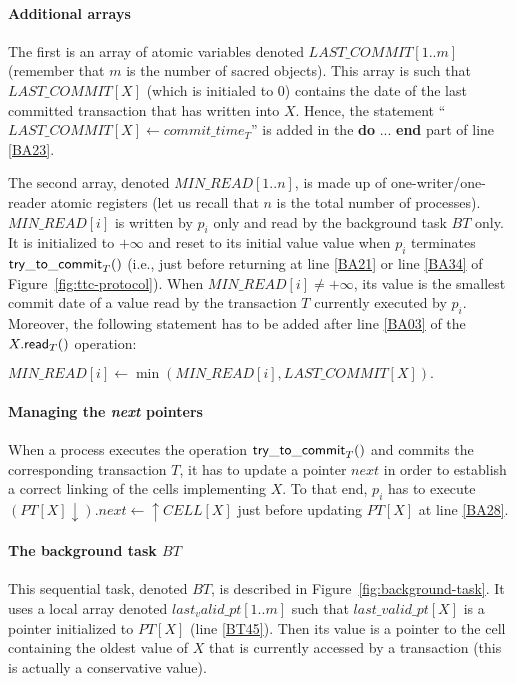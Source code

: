 \paragraph{Additional arrays}
The first is an array of atomic 
variables denoted $\mathit{LAST\_COMMIT}[1..m]$ 
(remember that $m$ is the number of sacred objects).  This array 
is such that  $\mathit{LAST\_COMMIT}[X]$ (which is initialed to $0$) 
contains the date of the last  committed transaction that has written into $X$.
Hence, the  statement ``$\mathit{LAST\_COMMIT}[X] \leftarrow commit\_time_T$''
is added in the {\bf do} ... {\bf end} part of line \ref{BA23}. 


The second  array, denoted  $\mathit{MIN\_READ}[1..n]$, is  
made up of one-writer/one-reader atomic registers 
(let us recall that $n$ is the total number of processes).
$\mathit{MIN\_READ}[i]$ is written by $p_i$ only and read by the 
background task $BT$ only.  It is initialized to $+\infty$ and reset to its 
initial value value when $p_i$ terminates  ${\sf try\_to\_commit}_T()$
(i.e., just before returning at line \ref{BA21} or line  \ref{BA34} 
of Figure~\ref{fig:ttc-protocol}). 
When $\mathit{MIN\_READ}[i]\neq +\infty$, its value is  the smallest commit 
date of a value read by the transaction $T$ currently executed by $p_i$. 
%
Moreover, the following statement has to be added after line \ref{BA03}
of the  $X.{\sf read}_T()$ operation:\\
\centerline{$\mathit{MIN\_READ}[i] \leftarrow 
             \min(\mathit{MIN\_READ}[i],\mathit{LAST\_COMMIT}[X]).$}


\paragraph{Managing the {\it next} pointers}
When   a  process  executes  the  operation  ${\sf try\_to\_commit}_T()$   
and commits the corresponding transaction  $T$, it has to update a  
pointer $next$ in order to  establish a correct linking  of the  cells  
implementing  $X$.  To that end,  $p_i$  has to execute 
$(PT[X]\downarrow).next\leftarrow \uparrow CELL[X]$ 
just before updating  $PT[X]$ at line \ref{BA28}. 





\paragraph{The background task $BT$}
This sequential task, denoted $BT$, is described in 
Figure~\ref{fig:background-task}. It uses a local array denoted  
$last_valid\_pt[1..m]$   such that $last\_valid\_pt[X]$ is a pointer 
initialized   to  $PT[X]$ (line \ref{BT45}). 
Then its value is a  pointer to the cell containing the 
oldest value of $X$ that is currently accessed by a transaction
(this is actually a  conservative value). 


